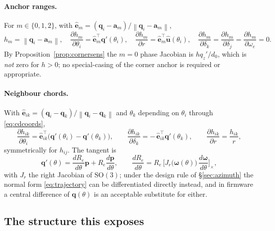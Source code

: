 \documentclass[11pt,a4paper]{article}
\newcommand{\SO}{\mathrm{SO}}
\newcommand{\q}{\bm{q}}
\newcommand{\pv}{\bm{p}}
\newcommand{\av}{\bm{a}}
\newcommand{\Rot}{R}
\newcommand{\norm}[1]{\left\lVert#1\right\rVert}
\begin{document}
\paragraph{Anchor ranges.} For $m\in\{0,1,2\}$, with
$\hat{\bm e}_m = (\q_i-\av_m)/\norm{\q_i-\av_m}$,
\begin{equation}
h_m = \norm{\q_i - \av_m},
\quad
\frac{\partial h_m}{\partial\theta_i} = \hat{\bm e}_m^\top \q'(\theta_i),
\quad
\frac{\partial h_m}{\partial r} = \hat{\bm e}_m^\top \hat{\bm u}(\theta_i),
\quad
\frac{\partial h_m}{\partial \delta_k} =
\frac{\partial h_m}{\partial \delta_j} =
\frac{\partial h_m}{\partial \omega_e} = 0 .
\label{eq:janchor}
\end{equation}
By Proposition~\ref{prop:cornersens} the $m=0$ phase Jacobian is $h q_z'/d_0$,
which is \emph{not} zero for $h>0$; no special-casing of the corner anchor is
required or appropriate.

\paragraph{Neighbour chords.} With
$\hat{\bm e}_{ik} = (\q_i-\q_k)/\norm{\q_i-\q_k}$ and $\theta_k$ depending on
$\theta_i$ through \eqref{eq:cdcoords},
\begin{equation}
\frac{\partial h_{ik}}{\partial\theta_i} = \hat{\bm e}_{ik}^\top\big(\q'(\theta_i)-\q'(\theta_k)\big),
\qquad
\frac{\partial h_{ik}}{\partial\delta_k} = -\,\hat{\bm e}_{ik}^\top \q'(\theta_k),
\qquad
\frac{\partial h_{ik}}{\partial r} = \frac{h_{ik}}{r},
\label{eq:jchord}
\end{equation}
symmetrically for $h_{ij}$. The tangent is
\begin{equation}
\q'(\theta) = \frac{d\Rot_e}{d\theta}\pv + \Rot_e\frac{d\pv}{d\theta},
\qquad
\frac{d\Rot_e}{d\theta} = \Rot_e\,\Big[J_r\big(\bm\omega(\theta)\big)\,\frac{d\bm\omega}{d\theta}\Big]_\times ,
\end{equation}
with $J_r$ the right Jacobian of $\SO(3)$; under the design rule of
\S\ref{sec:azimuth} the normal form \eqref{eq:trajectory} can be differentiated
directly instead, and in firmware a central difference of $\q(\theta)$ is an
acceptable substitute for either.

\subsection{The structure this exposes}
\end{document}
